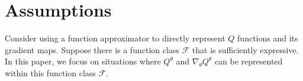 \documentclass{article}
\numberwithin{equation}{section}
\begin{document}
\begin{comment}
\paragraph{On-policy Policy Gradient Methods} In order to achieve the optimal policy, policy gradient methods update parameters along the direction of estimated gradient. Vanilla Policy Gradient(PG) method REINFORCE and its variant GPOMDP using Natural Policy Gradient(NPG) methods were proposed and developed by \cite{williams1992simple, sutton2000policy, kakade2001natural}. Early policy gradient methods suffered from its huge variance, hence a lot of variance-reduced modifications of REINFORCE and GPOMDP were proposed. 
\cite{papini2018stochastic} introduced stochastic gradient technique into gradient estimation and proposed Stochastic Variance-Reduced Policy Gradient(SVRPG) algorithm to effectively reduce variance and achieved $O(1/\varepsilon^2)$ sample complexity to reach an $\varepsilon$ stationary policy, i.e, $\left\|\mathbb{E} [\nabla_{\theta} v_{\theta}]\right\|_2^2 \leq \varepsilon.$ This complexity upper bound was soon improved to $O(1/\varepsilon^{\frac{5}{3}})$ by \cite{xu2020improved}, and further to $O(1/\varepsilon^{\frac{3}{2}})$ by \cite{xu2019sample}. Another variant, Hessian Aid Policy Gradient(HAPG) in \cite{shen2019hessian}, replaces calculating gradient correction in stochastic gradient estimation with constructing an unbiased estimate of policy Hessian and also needs $O(1/\varepsilon^{\frac{3}{2}})$ sampled trajectories to reach $\varepsilon$ stationary policy. For a long time, analysis of convergent behavior has been limited within local optimality. Recently, \cite{agarwal2021theory} prove the convergence to the global optimal solution for the first time. They prove that in tabular case, several PG methods converge with $O(1/\varepsilon^2)$ sample complexity, while NPG method with softmax paramiterization converges with $O(1/\varepsilon)$ samples to global optimum. 
\end{comment}

\section{Assumptions}
Consider using a function approximator to directly represent $Q$ functions and its gradient maps. Suppose there is a function class $\mathcal{F}$ that is sufficiently expressive. In this paper, we focus on situations where $Q^{\theta}$ and $\nabla_{\theta}Q^{\theta}$ can be represented within this function class $\mathcal{F}$. 
\end{document}

